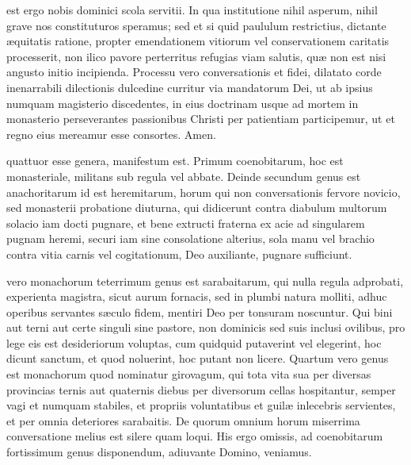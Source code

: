 \documentclass[fontsize=9pt,paper=A6,twoside,BCOR=1mm,DIV=22,headinclude]{scrarticle}
\begin{document}
\begin{multicols}{2}

 est ergo nobis dominici scola servitii. In qua institutione nihil asperum, nihil grave nos constituturos speramus; sed et si quid paululum restrictius, dictante æquitatis ratione, propter emendationem vitiorum vel conservationem caritatis processerit, non ilico pavore perterritus refugias viam salutis, quæ non est nisi angusto initio incipienda. Processu vero conversationis et fidei, dilatato corde inenarrabili dilectionis dulcedine curritur via mandatorum Dei, ut ab ipsius numquam magisterio discedentes, in eius doctrinam usque ad mortem in monasterio perseverantes passionibus Christi per patientiam participemur, ut et regno eius mereamur esse consortes. Amen.





 quattuor esse genera, manifestum est. Primum coenobitarum, hoc est monasteriale, militans sub regula vel abbate. Deinde secundum genus est anachoritarum id est heremitarum, horum qui non conversationis fervore novicio, sed monasterii probatione diuturna, qui didicerunt contra diabulum multorum solacio iam docti pugnare, et bene extructi fraterna ex acie ad singularem pugnam heremi, securi iam sine consolatione alterius, sola manu vel brachio contra vitia carnis vel cogitationum, Deo auxiliante, pugnare sufficiunt.


 vero monachorum teterrimum genus est sarabaitarum, qui nulla regula adprobati, experienta magistra, sicut aurum fornacis, sed in plumbi natura molliti, adhuc operibus servantes sæculo fidem, mentiri Deo per tonsuram noscuntur. Qui bini aut terni aut certe singuli sine pastore, non dominicis sed suis inclusi ovilibus, pro lege eis est desideriorum voluptas, cum quidquid putaverint vel elegerint, hoc dicunt sanctum, et quod noluerint, hoc putant non licere. Quartum vero genus est monachorum quod nominatur girovagum, qui tota vita sua per diversas provincias ternis aut quaternis diebus per diversorum cellas hospitantur, semper vagi et numquam stabiles, et propriis voluntatibus et guilæ inlecebris servientes, et per omnia deteriores sarabaitis. De quorum omnium horum miserrima conversatione melius est silere quam loqui. His ergo omissis, ad coenobitarum fortissimum genus disponendum, adiuvante Domino, veniamus.


\end{multicols}
\end{document}
